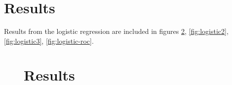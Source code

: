 \section{Results}
Results from the logistic regression are included in figures 
\ref{fig:logistic1}, \ref{fig:logistic2}, \ref{fig:logistic3}, 
\ref{fig:logistic-roc}.





\begin{figure}%
\section{Results}\label{fig:logistic1}
\begin{figure}[H]
\begin{center}
     \\
\end{center}

\end{figure}
\end{figure}
